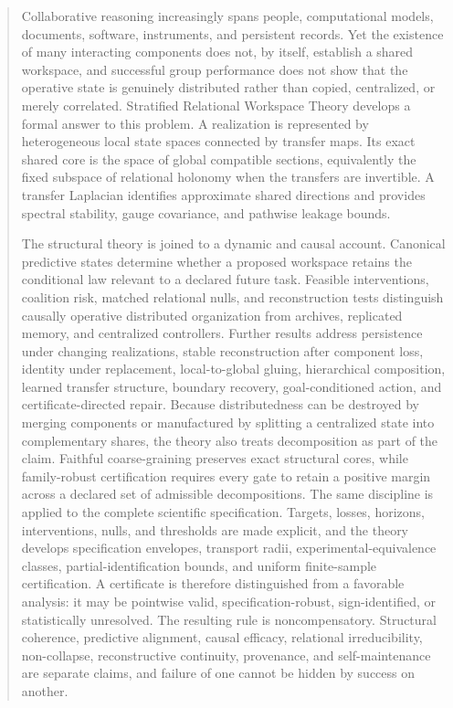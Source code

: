 \begin{abstract}
Collaborative reasoning increasingly spans people, computational models, documents, software,
instruments, and persistent records. Yet the existence of many interacting components does not,
by itself, establish a shared workspace, and successful group performance does not show that the
operative state is genuinely distributed rather than copied, centralized, or merely correlated.
Stratified Relational Workspace Theory develops a formal answer to this problem. A realization
is represented by heterogeneous local state spaces connected by transfer maps. Its exact shared
core is the space of global compatible sections, equivalently the fixed subspace of relational
holonomy when the transfers are invertible. A transfer Laplacian identifies approximate shared
directions and provides spectral stability, gauge covariance, and pathwise leakage bounds.

The structural theory is joined to a dynamic and causal account. Canonical predictive states
determine whether a proposed workspace retains the conditional law relevant to a declared
future task. Feasible interventions, coalition risk, matched relational nulls, and reconstruction
tests distinguish causally operative distributed organization from archives, replicated memory,
and centralized controllers. Further results address persistence under changing realizations,
stable reconstruction after component loss, identity under replacement, local-to-global gluing,
hierarchical composition, learned transfer structure, boundary recovery, goal-conditioned action,
and certificate-directed repair. Because distributedness can be destroyed by merging components
or manufactured by splitting a centralized state into complementary shares, the theory also treats
decomposition as part of the claim. Faithful coarse-graining preserves exact structural cores, while
family-robust certification requires every gate to retain a positive margin across a declared set of
admissible decompositions. The same discipline is applied to the complete scientific specification.
Targets, losses, horizons, interventions, nulls, and thresholds are made explicit, and the theory develops
specification envelopes, transport radii, experimental-equivalence classes, partial-identification bounds,
and uniform finite-sample certification. A certificate is therefore distinguished from a favorable
analysis: it may be pointwise valid, specification-robust, sign-identified, or statistically unresolved.
The resulting rule is noncompensatory. Structural coherence, predictive alignment, causal efficacy,
relational irreducibility, non-collapse, reconstructive continuity, provenance, and self-maintenance are
separate claims, and failure of one cannot be hidden by success on another.


\end{abstract}
